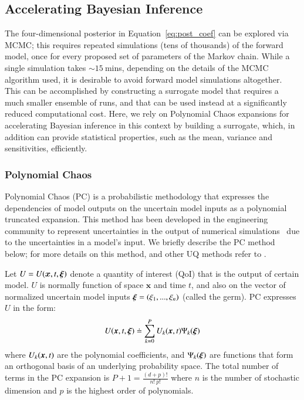 \subsection{Accelerating Bayesian Inference}
\label{sec:uqpce}


The four-dimensional posterior in Equation~\eqref{eq:post_coef} can be explored via MCMC;
this requires repeated simulations (tens of thousands) of the forward \geoclaw model, 
once for every proposed set of parameters of the Markov chain. While a single \geoclaw simulation
takes $\sim 15~$mins, depending on the details of the MCMC algorithm used, it is desirable 
to avoid forward model simulations altogether. This can be accomplished by constructing a 
surrogate model that requires a much
smaller ensemble of \geoclaw runs, and that can be used instead
at a significantly reduced computational cost.  Here, we rely on
Polynomial Chaos expansions for accelerating Bayesian inference in this context 
by building a surrogate, which, in addition can provide statistical properties, such as the mean, variance and sensitivities, efficiently. 

\subsubsection{Polynomial Chaos}

Polynomial Chaos (PC) is a probabilistic methodology that expresses the 
dependencies of model outputs on the uncertain model inputs
as a polynomial truncated expansion. This method has been developed in 
the engineering community to represent uncertainties in the output of 
numerical simulations~\citep{Villegas2012,Lin2009,Xiu2004}
due to the uncertainties in a model's input. We briefly describe the PC
method below; for more details on this method, and other UQ methods
refer to \citep{LeMaitreKnio2010}.

Let $U=U(\bm{x},t,\xxi)$ denote a quantity of 
interest (QoI) that is the output of certain model.
$U$ is normally function of space $\bm{x}$ and time $t$, and 
also on the vector of normalized uncertain model inputs $\xxi=(\xi_1,...,\xi_n)$ (called the germ). 
PC expresses $U$ in the form:
\begin{equation}
  U(\xbold,t,\xxi) \doteq \sum_{k = 0}^P U_k(\xbold,t) \Psi_k(\xxi)
\label{eq:stochseries}
\end{equation} 
where $U_k(\xbold,t)$ are the polynomial coefficients, and
$\Psi_k(\xxi)$ are functions that form an orthogonal basis of an underlying probability
space. The total number of terms in the PC expansion is
$P+1 = \frac{(d+p)! }{n!\ p!}$ where $n$ is the number of stochastic dimension and $p$ is the highest order
of polynomials. 

